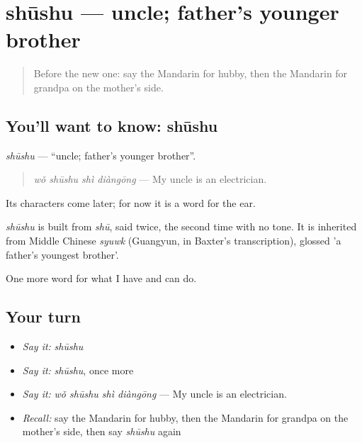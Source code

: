 \section[shūshu]{shūshu — uncle; father's younger brother}

\label{lesson:ZH-C272-shushu}



\begin{quote}
Before the new one: say the Mandarin for hubby, then the Mandarin for grandpa on the mother's side.
\end{quote}

\subsection*{You'll want to know: shūshu}
\emph{shūshu} — \textquotedblleft{}uncle; father's younger brother\textquotedblright{}.

\begin{quote}
\emph{wǒ shūshu shì diàngōng} — My uncle is an electrician.
\end{quote}

Its characters come later; for now it is a word for the ear.

\begin{cousinweb}
\emph{shūshu} is built from \emph{shū}, said twice, the second time with no tone. It is inherited from Middle Chinese \emph{syuwk} (Guangyun, in Baxter's transcription), glossed 'a father's youngest brother'.
\end{cousinweb}

\begin{grammarlens}[title={What you've built}]
One more word for what I have and can do.
\end{grammarlens}

\subsection*{Your turn}
\begin{itemize}
\raggedright
  \item \emph{Say it:} \emph{shūshu}
  \item \emph{Say it:} \emph{shūshu}, once more
  \item \emph{Say it:} \emph{wǒ shūshu shì diàngōng} — My uncle is an electrician.
  \item \emph{Recall:} say the Mandarin for hubby, then the Mandarin for grandpa on the mother's side, then say \emph{shūshu} again
\end{itemize}

